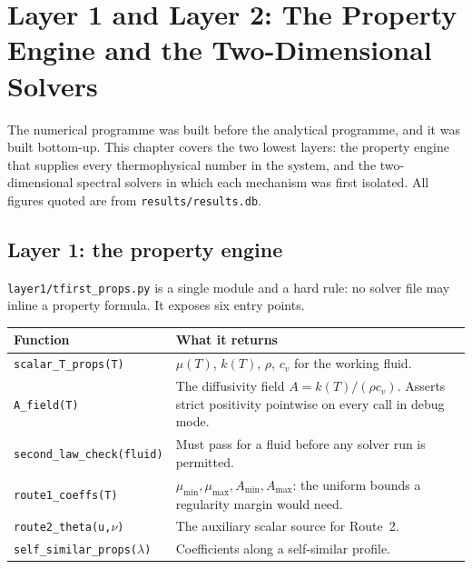 \chapter{Layer 1 and Layer 2: The Property Engine and the Two-Dimensional Solvers}
\label{ch:layer12}

The numerical programme was built before the analytical programme, and it was
built bottom-up. This chapter covers the two lowest layers: the property
engine that supplies every thermophysical number in the system, and the
two-dimensional spectral solvers in which each mechanism was first isolated.
All figures quoted are from \texttt{results/results.db}.

\section{Layer 1: the property engine}
\label{sec:layer1}

\texttt{layer1/tfirst\_props.py} is a single module and a hard rule: no solver
file may inline a property formula. It exposes six entry points.

\begin{center}
\small
\begin{tabular}{@{}l p{}@{}}
\toprule
Function & What it returns \\
\midrule
\texttt{scalar\_T\_props(T)}
  & \(\mu(T)\), \(k(T)\), \(\rho\), \(c_v\) for the working fluid. \\
\texttt{A\_field(T)}
  & The diffusivity field \(A=k(T)/(\rho c_v)\). Asserts strict positivity
    pointwise on every call in debug mode. \\
\texttt{second\_law\_check(fluid)}
  & Must pass for a fluid before any solver run is permitted. \\
\texttt{route1\_coeffs(T)}
  & \(\mu_{\min},\mu_{\max},A_{\min},A_{\max}\): the uniform bounds a
    regularity margin would need. \\
\texttt{route2\_theta(u,\(\nu\))}
  & The auxiliary scalar source for Route~2. \\
\texttt{self\_similar\_props(\(\lambda\))}
  & Coefficients along a self-similar profile. \\
\bottomrule
\end{tabular}
\end{center}


